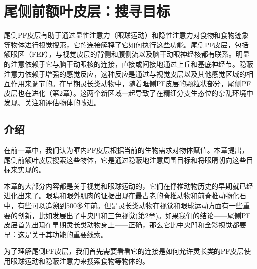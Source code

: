 \chapter{尾侧前额叶皮层：搜寻目标} \label{chap:chap5}
尾侧PF皮层有助于通过显性注意力（眼球运动）和隐性注意力对食物和食物迹象等物体进行视觉搜索，它的连接解释了它如何执行这些功能。尾侧PF皮层，包括额眼区（FEF），与视觉皮层的背侧和腹侧流以及脑干动眼神经核都有联系。明显的注意依赖于它与脑干动眼核的连接，直接或间接地通过上丘和基底神经节。隐蔽注意力依赖于增强的感觉反应，这种反应是通过与视觉皮层以及其他感觉区域的相互作用来调节的。在早期灵长类动物中，随着眶侧PF皮层的颗粒状部分，尾侧PF皮层也在进化（第2章）。这两个新区域一起导致了在精细分支生态位的杂乱环境中发现、关注和评估物体的改进。

\section{介绍}
在前一章中，我们认为眶内PF皮层根据当前的生物需求对物体赋值。本章提出，尾侧前额叶皮层搜索这些物体，它是通过隐蔽地注意周围目标和将眼睛朝向这些目标来实现的。

本章的大部分内容都是关于视觉和眼球运动的，它们在脊椎动物历史的早期就已经进化出来了。眼睛和眼外肌肉的证据出现在最古老的脊椎动物和前脊椎动物化石中，有些可以追溯到500多年前\cite{Shu et al. 2003}。但是灵长类动物在视觉和眼球运动方面有一些重要的创新，比如发展出了中央凹和三色视觉(第2章)。如果我们的结论——尾侧PF皮层首先出现在早期灵长类动物身上——正确，那么它比中央凹和全彩视觉都要早：这是关于其功能的重要线索。

为了理解尾侧PF皮层，我们首先需要看看它的连接是如何允许灵长类的PF皮层使用眼球运动和隐蔽注意力来搜索食物等物体的。
